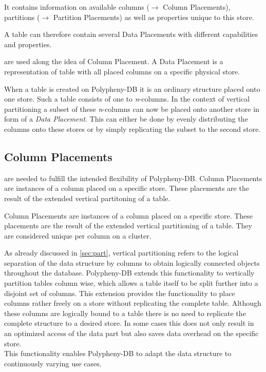 It contains information on available columns ($\rightarrow$ Column Placements), partitions ($\rightarrow$ Partition Placements)
as well as properties unique to this store.

A table can therefore contain several Data Placements with different capabilities and properties. 

are used along the idea of Column Placement. A Data Placement 
    is a representation of table with all placed columns on a specific physical store.

    When a table is created on Polypheny-DB it is an ordinary structure placed onto 
    one store. Such a table consists of one to \textit{n}-columns.
    In the context of vertical partitioning a subset of these \textit{n}-columns can now 
    be placed onto another store in form of a \textit{Data Placement}.
    This can either be done by evenly distributing the columns onto these stores 
    or by simply replicating the subset to the second store.\\

    


\subsection{Column Placements} 
are needed to fulfill the intended flexibility of Polypheny-DB. 
    Column Placements are instances of a column placed on a specific store.
    These placements are the result of the extended vertical partitoning of a table.
    
Column Placements are instances of a column placed on a specific store.
These placements are the result of the extended vertical partitioning of a table.
They are considered unique per column on a cluster.

As already discussed in \ref{sec:part}, vertical partitioning refers to the logical 
separation of the data structure by columns to obtain logically connected objects throughout 
the database. 
Polypheny-DB extends this functionality to vertically partition tables
column wise, which allows a table itself to be split further into a disjoint 
set of columns. This extension provides the functionality to place columns 
rather freely on a store without replicating the complete table. 
Although these columns are logically bound to a table there is no need 
to replicate the complete structure to a desired store. In some cases 
this does not only result in an optimized access of the data part but 
also saves data overhead on the specific store.\\
This functionality enables Polypheny-DB to adapt the data structure to continuously 
varying use cases.\\



